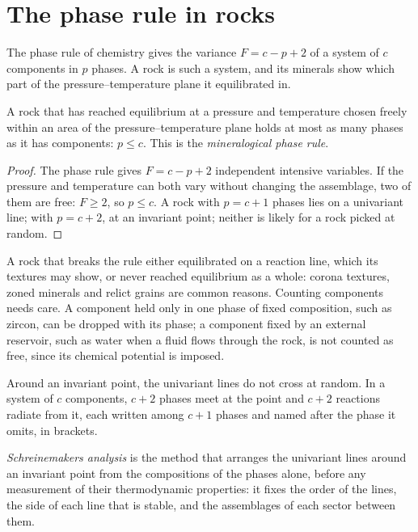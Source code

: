 \section{The phase rule in rocks}\label{sec:b3:petrological-thermodynamics:phase-rule}

The phase rule of chemistry gives the variance $F = c - p + 2$ of a system of
$c$ components in $p$ phases. A rock is such a system, and its minerals show
which part of the pressure--temperature plane it equilibrated in.

\begin{proposition}\label{prop:b3:petrological-thermodynamics:goldschmidt}
A rock that has reached equilibrium at a pressure and temperature chosen
freely within an area of the pressure--temperature plane holds at most as
many phases as it has components: $p \le c$. This is the
\emph{mineralogical phase rule}.
\end{proposition}

\begin{proof}
The phase rule gives $F = c - p + 2$ independent intensive variables. If the
pressure and temperature can both vary without changing the assemblage, two
of them are free: $F \ge 2$, so $p \le c$. A rock with $p = c + 1$ phases lies
on a univariant line; with $p = c + 2$, at an invariant point; neither is
likely for a rock picked at random.
\end{proof}

A rock that breaks the rule either equilibrated on a reaction line, which its
textures may show, or never reached equilibrium as a whole: corona textures,
zoned minerals and relict grains are common reasons. Counting components
needs care. A component held only in one phase of fixed composition, such as
zircon, can be dropped with its phase; a component fixed by an external
reservoir, such as water when a fluid flows through the rock, is not counted
as free, since its chemical potential is imposed.

Around an invariant point, the univariant lines do not cross at random. In a
system of $c$ components, $c + 2$ phases meet at the point and $c + 2$
reactions radiate from it, each written among $c + 1$ phases and named after
the phase it omits, in brackets.

\begin{definition}\label{def:b3:petrological-thermodynamics:schreinemakers}
\emph{Schreinemakers analysis} is the method
that arranges the univariant lines around an invariant point from the
compositions of the phases alone, before any measurement of their
thermodynamic properties: it fixes the order of the lines, the side of each
line that is stable, and the assemblages of each sector between them.
\end{definition}

